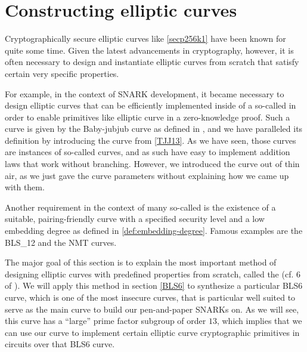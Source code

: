 
\section{Constructing elliptic curves} Cryptographically secure elliptic curves like  \ref{secp256k1} have been known for quite some time. Given the latest advancements in cryptography, however, it is often necessary to design and instantiate elliptic curves from scratch that satisfy certain very specific properties. 

For example, in the context of SNARK development, it became necessary to design elliptic curves that can be efficiently implemented inside of a so-called  in order to enable primitives like elliptic curve  in a zero-knowledge proof. Such a curve is given by the Baby-jubjub curve as defined in \cite{whitehat-21}, and we have paralleled its definition by introducing the  curve from \examplename{} \ref{TJJ13}. As we have seen, those curves are instances of so-called  curves, and as such have easy to implement addition laws that work without branching. However, we introduced the  curve out of thin air, as we just gave the curve parameters without explaining how we came up with them.

Another requirement in the context of many so-called  is the existence of a suitable, pairing-friendly curve with a specified security level and a low embedding degree as defined in \ref{def:embedding-degree}. Famous examples are the BLS\_12 and the NMT curves.

The major goal of this section is to explain the most important method of designing elliptic curves with predefined properties from scratch, called the  (cf. \chaptname{} 6 of \cite{silverman-1994}). We will apply this method in section \ref{BLS6} to synthesize a particular BLS6 curve, which is one of the most insecure curves, that is particular well suited to serve  as the main curve to build our pen-and-paper SNARKs on. As we will see, this curve has a ``large'' prime factor subgroup of order $13$, which implies that we can use our  curve to implement certain elliptic curve cryptographic primitives in circuits over that BLS6 curve. 
 
